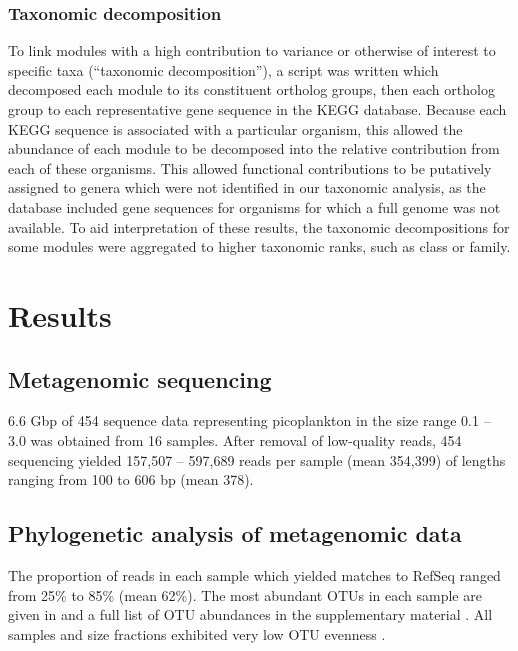 \subsubsection{Taxonomic decomposition}

To link modules with a high contribution to variance or otherwise of interest to specific taxa (``taxonomic decomposition''), a script was written which decomposed each module to its constituent ortholog groups, then each ortholog group to each representative gene sequence in the \ac{KEGG} database.
Because each \ac{KEGG} sequence is associated with a particular organism, this allowed the abundance of each module to be decomposed into the relative contribution from each of these organisms.
This allowed functional contributions to be putatively assigned to genera which were not identified in our taxonomic analysis, as the database included gene sequences for organisms for which a full genome was not available.
To aid interpretation of these results, the taxonomic decompositions for some modules were aggregated to higher taxonomic ranks, such as class or family.

\section{Results}

\subsection{Metagenomic sequencing}
6.6 Gbp of 454 sequence data representing picoplankton in the size range 0.1 -- 3.0 \micron{} was obtained from 16 samples. 
After removal of low-quality reads, 454 sequencing yielded 157,507 -- 597,689 reads per sample (mean 354,399) of lengths ranging from 100 to 606 bp (mean 378).

\subsection{Phylogenetic analysis of metagenomic data}

The proportion of reads in each sample which yielded matches to RefSeq ranged from 25\% to 85\% (mean 62\%).
The most abundant \acp{OTU} in each sample are given in  and a full list of \ac{OTU} abundances in the supplementary material .
All samples and size fractions exhibited very low \ac{OTU} evenness .





